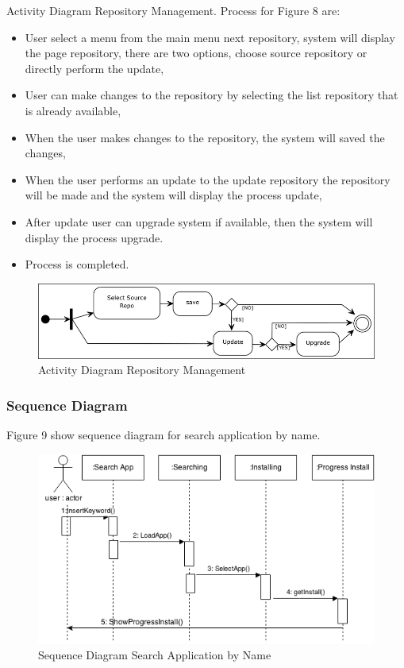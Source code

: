 \documentclass[conference, letterpaper]{IEEEtran}
\begin{document}
Activity Diagram Repository Management. Process for Figure 8 are:
\begin{itemize}
\item User select a menu from the main menu next repository, system will display the page repository, there are two options, choose source repository or directly perform the update,
\item User can make changes to the repository by selecting the list
repository that is already available,
\item When the user makes changes to the repository, the system will saved the changes,
\item When the user performs an update to the update repository the repository will be made and the system will display the process update,
\item After update user can upgrade system if available, then the system will display the process upgrade.
\item Process is completed.
\end{itemize}

\begin{figure}[!t]
\centering
\includegraphics[scale=0.5]{image/ADManagement.png}
\caption{Activity Diagram Repository Management}
\end{figure}

\subsubsection{Sequence Diagram}
Figure 9 show sequence diagram for search application by name.

\begin{figure}[!t]
\centering
\includegraphics[scale=0.4]{image/SearchbyName.png}
\caption{Sequence Diagram Search Application by Name}
\end{figure}
\end{document}
